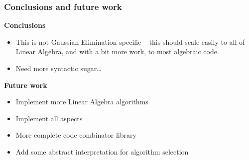 \documentclass{beamer}
\begin{document}
\begin{frame}
\frametitle{Conclusions and future work}
\textbf{Conclusions}
\begin{itemize}
    \item This is not Gaussian Elimination specific -- this should scale
easily to all of Linear Algebra, and with a bit more work, to
most algebraic code.
    \item Need more syntactic sugar\dots
\end{itemize}

\textbf{Future work}
\begin{itemize}
    \item Implement more Linear Algebra algorithms
    \item Implement all aspects
    \item More complete code combinator library
    \item Add some abstract interpretation for algorithm selection
\end{itemize}

\end{frame}
\end{document}
